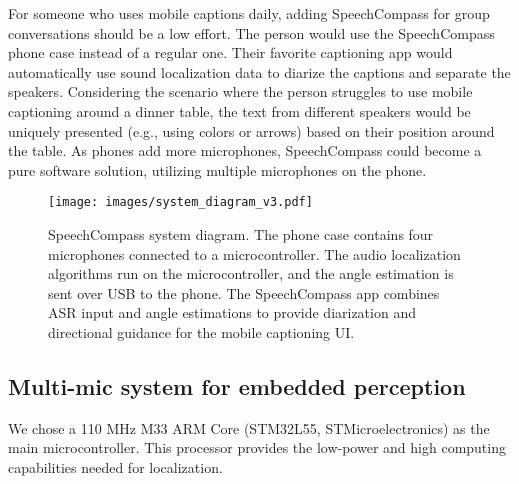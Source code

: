 For someone who uses mobile captions daily, adding SpeechCompass for group conversations should be a low effort. The person would use the SpeechCompass phone case instead of a regular one. Their favorite captioning app would automatically use sound localization data to diarize the captions and separate the speakers. Considering the scenario where the person struggles to use mobile captioning around a dinner table, the text from different speakers would be uniquely presented (e.g., using colors or arrows) based on their position around the table. As phones add more microphones, SpeechCompass could become a pure software solution, utilizing multiple microphones on the phone. 

\begin{figure*}
  \centering
  \texttt{[image: images/system\_diagram\_v3.pdf]}
  \caption{SpeechCompass system diagram. The phone case contains four microphones connected to a microcontroller. The audio localization algorithms run on the microcontroller, and the angle estimation is sent over USB to the phone. The SpeechCompass app combines ASR input and angle estimations to provide diarization and directional guidance for the mobile captioning UI.}
  \label{fig:system_diagram}  
\end{figure*}


\subsection{Multi-mic system for embedded perception}
We chose a 110 MHz M33 ARM Core (STM32L55, STMicroelectronics) as the main microcontroller. This processor provides the low-power and high computing capabilities needed for localization. 

